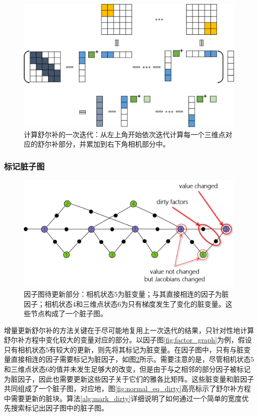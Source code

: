 \begin{figure}[htb!]
    \centering
    \includegraphics[width=\textwidth]{figs/schur_complement.png}
    \caption{计算舒尔补的一次迭代：从左上角开始依次迭代计算每一个三维点对应的舒尔补部分，并累加到右下角相机部分中。}
    \label{fig:schur_complement}
\end{figure}

\subsubsection{标记脏子图}

\begin{figure}[htb!]
    \centering
    \includegraphics[width=.8\textwidth]{figs/factor_graph_dirty.png}
    \caption{因子图待更新部分：相机状态$5$为脏变量；与其直接相连的因子为脏因子；相机状态$4$和三维点状态$6$为只有梯度发生了变化的脏变量。这些节点构成了一个脏子图。}
    \label{fig:factor_graph_dirty}
\end{figure}

增量更新舒尔补的方法关键在于尽可能地复用上一次迭代的结果，只针对性地计算舒尔补方程中变化较大的变量对应的部分。以因子图\ref{fig:factor_graph}为例，假设只有相机状态$5$有较大的更新，则先将其标记为脏变量。在因子图中，只有与脏变量直接相连的因子需要标记为脏因子，如图\ref{fig:factor_graph_dirty}所示。需要注意的是，尽管相机状态$5$和三维点状态$6$的值并未发生足够大的改变，但是由于与之相邻的部分因子被标记为脏因子，因此也需要更新这些因子关于它们的雅各比矩阵。这些脏变量和脏因子共同组成了一个脏子图，对应地，图\ref{fig:normal_eq_dirty}高亮标示了舒尔补方程中需要更新的脏块。算法\ref{alg:mark_dirty}详细说明了如何通过一个简单的宽度优先搜索标记出因子图中的脏子图。

